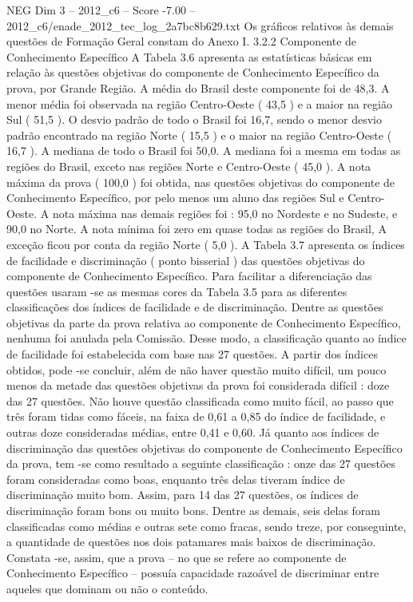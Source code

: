 \begin{textsample}{NEG Dim 3 – 2012\_c6 – Score -7.00 – 2012\_c6/enade\_2012\_tec\_log\_2a7bc8b629.txt}
Os gráficos relativos às demais questões de Formação Geral constam do Anexo I. 3.2.2 Componente de Conhecimento Específico A Tabela 3.6 apresenta as estatísticas básicas em relação às questões objetivas do componente de Conhecimento Específico da prova, por Grande Região.
A média do Brasil deste componente foi de 48,3.
A menor média foi observada na região Centro-Oeste ( 43,5 ) e a maior na região Sul ( 51,5 ).
O desvio padrão de todo o Brasil foi 16,7, sendo o menor desvio padrão encontrado na região Norte ( 15,5 ) e o maior na região Centro-Oeste ( 16,7 ).
A mediana de todo o Brasil foi 50,0.
A mediana foi a mesma em todas as regiões do Brasil, exceto nas regiões Norte e Centro-Oeste ( 45,0 ).
A nota máxima da prova ( 100,0 ) foi obtida, nas questões objetivas do componente de Conhecimento Específico, por pelo menos um aluno das regiões Sul e Centro-Oeste.
A nota máxima nas demais regiões foi : 95,0 no Nordeste e no Sudeste, e 90,0 no Norte.
A nota mínima foi zero em quase todas as regiões do Brasil, A exceção ficou por conta da região Norte ( 5,0 ).
A Tabela 3.7 apresenta os índices de facilidade e discriminação ( ponto bisserial ) das questões objetivas do componente de Conhecimento Específico.
Para facilitar a diferenciação das questões usaram -se as mesmas cores da Tabela 3.5 para as diferentes classificações dos índices de facilidade e de discriminação.
Dentre as questões objetivas da parte da prova relativa ao componente de Conhecimento Específico, nenhuma foi anulada pela Comissão.
Desse modo, a classificação quanto ao índice de facilidade foi estabelecida com base nas 27 questões.
A partir dos índices obtidos, pode -se concluir, além de não haver questão muito difícil, um pouco menos da metade das questões objetivas da prova foi considerada difícil : doze das 27 questões.
Não houve questão classificada como muito fácil, ao passo que três foram tidas como fáceis, na faixa de 0,61 a 0,85 do índice de facilidade, e outras doze consideradas médias, entre 0,41 e 0,60.
Já quanto aos índices de discriminação das questões objetivas do componente de Conhecimento Específico da prova, tem -se como resultado a seguinte classificação : onze das 27 questões foram consideradas como boas, enquanto três delas tiveram índice de discriminação muito bom.
Assim, para 14 das 27 questões, os índices de discriminação foram bons ou muito bons.
Dentre as demais, seis delas foram classificadas como médias e outras sete como fracas, sendo treze, por conseguinte, a quantidade de questões nos dois patamares mais baixos de discriminação.
Constata -se, assim, que a prova – no que se refere ao componente de Conhecimento Específico – possuía capacidade razoável de discriminar entre aqueles que dominam ou não o conteúdo.

\end{textsample}
